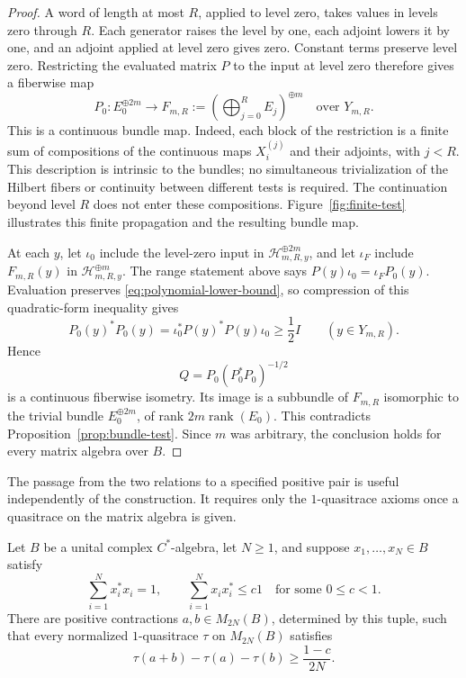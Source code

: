 \begin{proof}
A word of length at most $R$, applied to level zero, takes values in
levels zero through $R$.  Each generator raises the level by one, each
adjoint lowers it by one, and an adjoint applied at level zero gives
zero.  Constant terms preserve level zero.  Restricting the evaluated
matrix $P$ to the input at level zero therefore gives a fiberwise map
\begin{equation}
  P_0:E_0^{\oplus2m}\longrightarrow
  F_{m,R}:=\left(\bigoplus_{j=0}^{R}E_j\right)^{\oplus m}
  \quad\text{over }Y_{m,R}.
  \label{eq:polynomial-bundle-map}
\end{equation}
This is a continuous bundle map.  Indeed, each block of the
restriction is a finite sum of compositions of the continuous maps
$X_i^{(j)}$ and their adjoints, with $j<R$.  This description is
intrinsic to the bundles; no simultaneous trivialization of the
Hilbert fibers or continuity between different tests is required.
The continuation beyond level $R$ does not enter these compositions. Figure~\ref{fig:finite-test} illustrates
this finite propagation and the resulting bundle map.



At each $y$, let $\iota_0$ include the level-zero input in
$\mathcal H_{m,R,y}^{\oplus2m}$, and let $\iota_F$ include
$F_{m,R}(y)$ in $\mathcal H_{m,R,y}^{\oplus m}$.  The range statement
above says $P(y)\iota_0=\iota_F P_0(y)$.  Evaluation preserves
\eqref{eq:polynomial-lower-bound}, so compression of this quadratic-form
inequality gives
\[
  P_0(y)^*P_0(y)
  =\iota_0^*P(y)^*P(y)\iota_0
  \geq\frac12 I
  \qquad(y\in Y_{m,R}).
\]
Hence
\[
  Q=P_0(P_0^*P_0)^{-1/2}
\]
is a continuous fiberwise isometry.  Its image is a subbundle of
$F_{m,R}$ isomorphic to the trivial bundle $E_0^{\oplus2m}$, of rank
$2m\operatorname{rank}(E_0)$.  This contradicts
Proposition~\ref{prop:bundle-test}.  Since $m$ was arbitrary, the
conclusion holds for every matrix algebra over $B$.
\end{proof}

The passage from the two relations to a specified positive pair is
useful independently of the construction.  It requires only the
$1$-quasitrace axioms once a quasitrace on the matrix algebra is given.

\begin{lemma}
\label{lem:defect}
Let $B$ be a unital complex $C^*$-algebra, let $N\ge1$, and suppose
$x_1,\ldots,x_N\in B$ satisfy
\[
  \sum_{i=1}^N x_i^*x_i=1,
  \qquad
  \sum_{i=1}^N x_ix_i^*\le c1
  \quad\text{for some }0\le c<1.
\]
There are positive contractions $a,b\in M_{2N}(B)$, determined by this
tuple, such that every normalized $1$-quasitrace $\tau$ on $M_{2N}(B)$
satisfies
\begin{equation}
  \tau(a+b)-\tau(a)-\tau(b)\ge\frac{1-c}{2N}.
  \label{eq:uniform-defect}
\end{equation}
\end{lemma}

